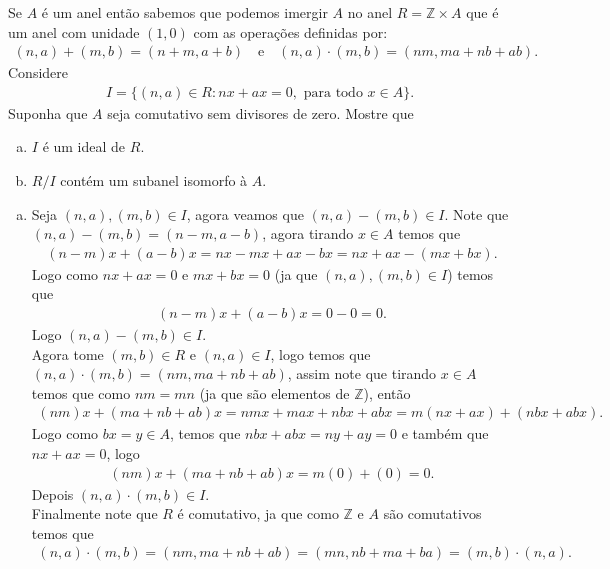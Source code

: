 \begin{homeworkProblem}[14]
  Se $A$ é um anel então sabemos que podemos imergir $A$ no anel $R=\mathbb{Z}\times A$ que é um anel com unidade $(1,0)$ com as operações definidas por:
  \begin{align*}
    (n,a)+(m,b)=(n+m,a+b)\quad\text{e}\quad(n,a)\cdot(m,b)=(nm,ma+nb+ab).
  \end{align*}
  Considere
  \begin{align*}
    I=\{(n,a)\in R: nx+ax=0,\text{ para todo }x\in A\}.
  \end{align*}
  Suponha que $A$ seja comutativo sem divisores de zero. Mostre que
  \begin{enumerate}[a)]
    \item $I$ é um ideal de $R$.
    \item $R/I$ contém um subanel isomorfo à $A$. 
  \end{enumerate}
  \begin{solution}
  \begin{enumerate}[a)]
    \item Seja $(n,a),(m,b)\in I$, agora veamos que $(n,a)-(m,b)\in I$.
      Note que $(n,a)-(m,b)=(n-m,a-b)$, agora tirando $x\in A$ temos que
      \begin{align*}
        (n-m)x+(a-b)x=nx-mx+ax-bx=nx+ax-(mx+bx).
      \end{align*}
      Logo como $nx+ax=0$ e $mx+bx=0$ (ja que $(n,a),(m,b)\in I$) temos que
      \begin{align*}
        (n-m)x+(a-b)x=0-0=0.
      \end{align*}
      Logo $(n,a)-(m,b)\in I$.\\
      Agora tome $(m,b)\in R$ e $(n,a)\in I$, logo temos que $(n,a)\cdot (m,b)=(nm,ma+nb+ab)$, assim note que tirando $x\in A$ temos que como $nm=mn$ (ja que são elementos de $\mathbb{Z}$), então 
      \begin{align*}
        (nm)x+(ma+nb+ab)x=nmx+max+nbx+abx=m(nx+ax)+(nbx+abx).
      \end{align*}
      Logo como $bx=y\in A$, temos que $nbx+abx=ny+ay=0$ e também que $nx+ax=0$, logo
      \begin{align*}
        (nm)x+(ma+nb+ab)x=m(0)+(0)=0.
      \end{align*}
      Depois $(n,a)\cdot(m,b)\in I$.\\
      Finalmente note que $R$ é comutativo, ja que como $\mathbb{Z}$ e $A$ são comutativos temos que
      \begin{align*}
        (n,a)\cdot (m,b)=(nm,ma+nb+ab)=(mn,nb+ma+ba)=(m,b)\cdot(n,a).

\end{align*}
\end{enumerate}
\end{solution}
\end{homeworkProblem}
